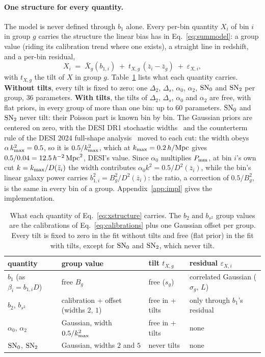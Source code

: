 \documentclass[11pt]{article}
\newcommand{\kmax}{k_{\rm max}}
\newcommand{\hMpc}{\,h/{\rm Mpc}}
\newcommand{\bstwo}{b_{s^2}}
\newcommand{\aunit}{\,h^{-2}\,{\rm Mpc}^2}
\newcommand{\SNz}{{\rm SN}_0}
\newcommand{\SNt}{{\rm SN}_2}
\begin{document}
\paragraph{One structure for every quantity.}
The model is never defined through $b_1$ alone.  Every per-bin
quantity $X_i$ of bin $i$ in group $g$ carries the structure the
linear bias has in Eq.~\eqref{eq:summodel}: a group value (riding its
calibration trend where one exists), a straight line in redshift, and
a per-bin residual,
\begin{equation}
  X_i \;=\; \bar{X}_g(b_{1,i})
  \;+\; t_{X,g}\,(\bar{z}_i - \bar{z}_g)
  \;+\; \varepsilon_{X,i} ,
  \label{eq:xstructure}
\end{equation}
with $t_{X,g}$ the tilt of $X$ in group $g$.  Table~\ref{tab:xcarries}
lists what each quantity carries.  \textbf{Without tilts}, every tilt
is fixed
to zero: one $\Delta_2$, $\Delta_s$, $\alpha_0$, $\alpha_2$, $\SNz$
and $\SNt$ per group, $36$ parameters.  \textbf{With tilts}, the
tilts of $\Delta_2$, $\Delta_s$, $\alpha_0$ and $\alpha_2$ are free,
with
flat priors, in every group of more than one bin: up to $60$
parameters.  $\SNz$ and $\SNt$ never tilt: their Poisson part is known
bin by bin.  The Gaussian priors are centered on zero, with the DESI
DR1 stochastic widths~\cite{Maus2024} and the counterterm rule of the
DESI 2024 full-shape analysis~\cite{DESI2024V,Maus2024} moved to each
cut: the width obeys $\alpha\,\kmax^2 = 0.5$, so it is $0.5/\kmax^2$,
which at $\kmax = 0.2\hMpc$ gives $0.5/0.04 = 12.5\aunit$, DESI's
value.  Since $\alpha_0$ multiplies $P_{\rm mm}$, at bin $i$'s own cut
$k = \kmax/D(\bar{z}_i)$ the width contributes
$\alpha_0 k^2 = 0.5/D^2(\bar{z}_i)$, while the bin's linear galaxy
power carries $b_{1,i}^2 = B_g^2/D^2(\bar{z}_i)$: the ratio, a
correction of $0.5/B_g^2$, is the same in every bin of a group.
Appendix~\ref{app:impl} gives the implementation.

\begin{table}[tbp]
  \centering
  \small
  \begin{tabular}{llll}
    \hline
    quantity & group value & tilt $t_{X,g}$ & residual $\varepsilon_{X,i}$ \\
    \hline
    $b_1$ (as $\beta_i = b_{1,i} D$) & free $B_g$ & free ($s_g$) &
      correlated Gaussian ($\sigma_g$, $L$) \\
    $b_2$, $\bstwo$ & calibration + offset (widths $2$, $1$) &
      free in + tilts & only through $b_1$'s residual \\
    $\alpha_0$, $\alpha_2$ & Gaussian, width $0.5/\kmax^2$ & free in + tilts & none \\
    $\SNz$, $\SNt$ & Gaussian, widths $2$ and $5$ & never tilts & none \\
    \hline
  \end{tabular}
  \caption{What each quantity of Eq.~\eqref{eq:xstructure} carries.
    The $b_2$ and $\bstwo$ group values are the calibrations of
    Eq.~\eqref{eq:calibrations} plus one Gaussian offset per group.
    Every tilt is fixed to zero in the fit without tilts and free
    (flat prior) in
    the fit with tilts, except for $\SNz$ and $\SNt$, which never tilt.}
  \label{tab:xcarries}
\end{table}
\end{document}
